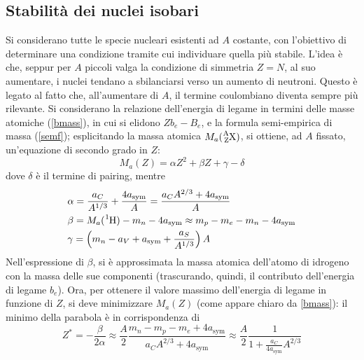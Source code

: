 \documentclass[11pt, a4paper]{scrartcl}
\theoremstyle{style}
\numberwithin{equation}{subsection}
\begin{document}
\subsection{Stabilit\`a dei nuclei isobari}
Si considerano tutte le specie nucleari esistenti ad $A$ costante, con l'obiettivo di determinare una condizione tramite cui individuare quella pi\`u stabile.
L'idea \`e che, seppur per $A$ piccoli valga la condizione di simmetria $Z = N$, al suo aumentare, i nuclei tendano a sbilanciarsi verso un aumento di neutroni. 
Questo \`e legato al fatto che, all'aumentare di $A$, il termine coulombiano diventa sempre pi\`u rilevante.
Si considerano la relazione dell'energia di legame in termini delle masse atomiche (\ref{bmass}), in cui si elidono $Zb_e - B_e$, e la formula semi-empirica di massa (\ref{semf}); esplicitando la massa atomica $M_a(\ce{^A_ZX})$, si ottiene, ad $A$ fissato, un'equazione di secondo grado in $Z$:
\begin{equation}
	M_a(Z) = \alpha  Z^2 + \beta Z + \gamma - \delta 
\end{equation}
dove $\delta $ \`e il termine di pairing, mentre
\begin{equation}
	\begin{split}
		&\alpha  = \frac{a_C}{A^{1/3}} + \frac{4 a_{\text{sym}}}{A} = \frac{a_C A^{2 / 3} + 4 a_{\text{sym}}}{A} \\
		&\beta = M_a(\ce{^1H}) - m_n - 4 a_{\text{sym}} \approx m_p - m_e - m_n - 4 a_{\text{sym}} \\
		&\gamma = \left(m_n - a_V + a_{\text{sym}} +\frac{ a_S}{A^{1 / 3}}\right) A
	\end{split}
\end{equation}
Nell'espressione di $\beta $, si \`e approssimata la massa atomica dell'atomo di idrogeno con la massa delle sue componenti (trascurando, quindi, il contributo dell'energia di legame $b_e$).
Ora, per ottenere il valore massimo dell'energia di legame in funzione di $Z$, si deve minimizzare $M_a(Z)$ (come appare chiaro da \ref{bmass}): il minimo della parabola \`e in corrispondenza di 
\begin{equation}
	Z^* = - \frac{\beta }{2\alpha }\approx \frac{A}{2} \frac{m_n - m_p - m_e + 4a_\text{sym}}{a_C A^{2 / 3} + 4 a_\text{sym}} \approx \frac{A}{2} \frac{1}{1 + \frac{a_C}{4 a _\text{sym}} A^{2 / 3}}
\end{equation}
\end{document}

